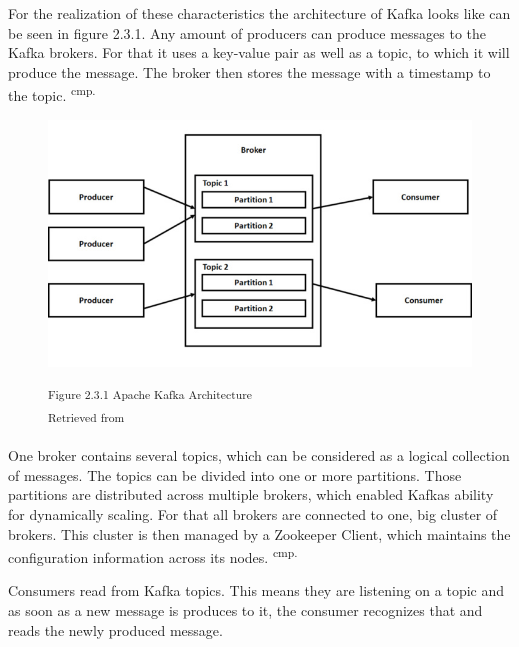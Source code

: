 For the realization of these characteristics the architecture of Kafka looks like can be seen in figure 2.3.1. Any amount of producers can produce messages to the Kafka brokers. For that it uses a key-value pair as well as a topic, to which it will produce the message. The broker then stores the message with a timestamp to the topic. \textsuperscript{cmp.\cite{26}}

\begin{figure}[h]
\centering
\includegraphics[width=\textwidth/5*4]{images/kafka_architecture.png}

\textsuperscript{Figure 2.3.1 Apache Kafka Architecture}\\
\textsuperscript{Retrieved from \cite{27}}
\end{figure}

One broker contains several topics, which can be considered as a logical collection of messages. The topics can be divided into one or more partitions. Those partitions are distributed across multiple brokers, which enabled Kafkas ability for dynamically scaling. For that all brokers are connected to one, big cluster of brokers. This cluster is then managed by a Zookeeper Client, which maintains the configuration information across its nodes. \textsuperscript{cmp.\cite{27}}


Consumers read from Kafka topics. This means they are listening on a topic and as soon as a new message is produces to it, the consumer recognizes that and reads the newly produced message.


